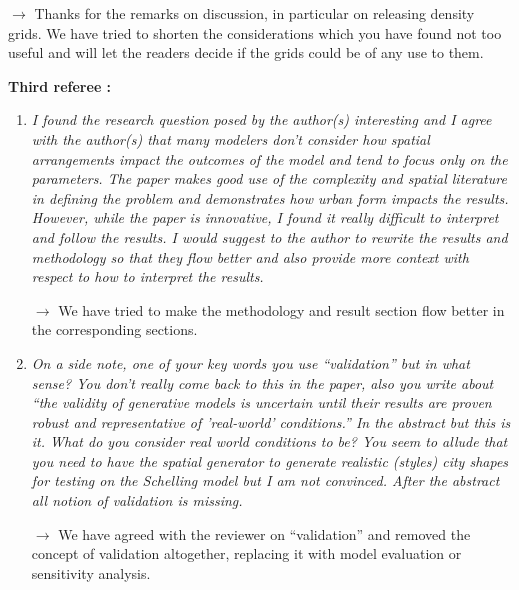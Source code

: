 \documentclass[11pt,a4paper,sans]{moderncv}        %
\begin{document}
\begin{enumerate}
	\medskip
	
	$\rightarrow$ Thanks for the remarks on discussion, in particular on releasing density grids. We have tried to shorten the considerations which you have found not too useful and will let the readers decide if the grids could be of any use to them.
\end{enumerate}







\bigskip
\bigskip

\textbf{Third referee :}

\bigskip

\begin{enumerate}
	\item \textit{I found the research question posed by the author(s) interesting and I agree with the author(s) that many modelers don’t consider how spatial arrangements impact the outcomes of the model and tend to focus only on the parameters. The paper makes good use of the complexity and spatial literature in defining the problem and demonstrates how urban form impacts the results. However, while the paper is innovative, I found it really difficult to interpret and follow the results. I would suggest to the author to rewrite the results and methodology so that they flow better and also provide more context with respect to how to interpret the results.}
	
	\medskip
	
	$\rightarrow$ We have tried to make the methodology and result section flow better in the corresponding sections.
	\bigskip
	
	
	\item \textit{On a side note, one of your key words you use “validation” but in what sense?  You don’t really come back to this in the paper, also you write about “the validity of generative models is uncertain until their results are proven robust and representative of ’real-world’ conditions.” In the abstract but this is it.  What do you consider real world conditions to be? You seem to allude that you need to have the spatial generator to generate realistic (styles) city shapes for testing on the Schelling model but I am not convinced.  After the abstract all notion of validation is missing.}
	
	\medskip
	
	$\rightarrow$ We have agreed with the reviewer on ``validation'' and removed the concept of validation altogether, replacing it with model evaluation or sensitivity analysis.
	\bigskip
	

\end{enumerate}
\end{document}

